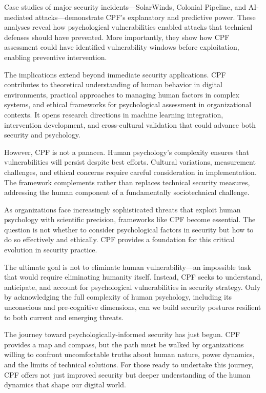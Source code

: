 \documentclass[manuscript,screen,review]{acmart}
\begin{document}
Case studies of major security incidents—SolarWinds, Colonial Pipeline, and AI-mediated attacks—demonstrate CPF's explanatory and predictive power. These analyses reveal how psychological vulnerabilities enabled attacks that technical defenses should have prevented. More importantly, they show how CPF assessment could have identified vulnerability windows before exploitation, enabling preventive intervention.

The implications extend beyond immediate security applications. CPF contributes to theoretical understanding of human behavior in digital environments, practical approaches to managing human factors in complex systems, and ethical frameworks for psychological assessment in organizational contexts. It opens research directions in machine learning integration, intervention development, and cross-cultural validation that could advance both security and psychology.

However, CPF is not a panacea. Human psychology's complexity ensures that vulnerabilities will persist despite best efforts. Cultural variations, measurement challenges, and ethical concerns require careful consideration in implementation. The framework complements rather than replaces technical security measures, addressing the human component of a fundamentally sociotechnical challenge.

As organizations face increasingly sophisticated threats that exploit human psychology with scientific precision, frameworks like CPF become essential. The question is not whether to consider psychological factors in security but how to do so effectively and ethically. CPF provides a foundation for this critical evolution in security practice.

The ultimate goal is not to eliminate human vulnerability—an impossible task that would require eliminating humanity itself. Instead, CPF seeks to understand, anticipate, and account for psychological vulnerabilities in security strategy. Only by acknowledging the full complexity of human psychology, including its unconscious and pre-cognitive dimensions, can we build security postures resilient to both current and emerging threats.

The journey toward psychologically-informed security has just begun. CPF provides a map and compass, but the path must be walked by organizations willing to confront uncomfortable truths about human nature, power dynamics, and the limits of technical solutions. For those ready to undertake this journey, CPF offers not just improved security but deeper understanding of the human dynamics that shape our digital world.
\end{document}

